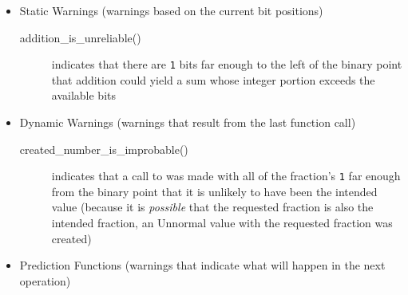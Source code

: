 \begin{itemize}
\begin{description}
    \end{description}
    \item Static Warnings (warnings based on the current bit positions)
    \begin{description}
        \item[addition\_is\_unreliable()] indicates that there are \lstinline{1} bits far enough to the left of the binary point that addition could yield a sum whose integer portion exceeds the available bits
    \end{description}
    \item Dynamic Warnings (warnings that result from the last function call)
    \begin{description}
        \item[created\_number\_is\_improbable()] indicates that a call to  was made with all of the fraction's \lstinline{1} far enough from the binary point that it is unlikely to have been the intended value (because it is \textit{possible} that the requested fraction is also the intended fraction, an Unnormal value with the requested fraction was created)
    \end{description}
    \item Prediction Functions (warnings that indicate what will happen in the next operation)

\end{itemize}
